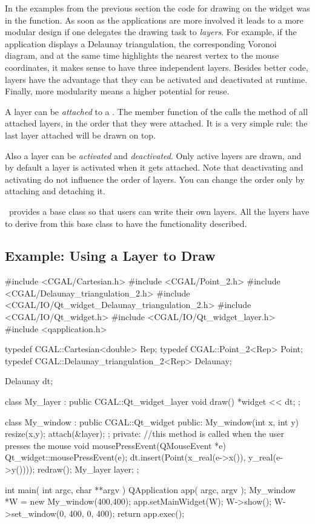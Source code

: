 In the examples from the previous section the code for drawing on the
widget was in the  function. As soon as the
applications are more involved it leads to a more modular design if
one delegates the drawing task to {\em layers}. For example, if the
application displays a Delaunay triangulation, the corresponding
Voronoi diagram, and at the same time highlights the nearest vertex to
the mouse coordinates, it makes sense to have three independent
layers. Besides better code, layers have the advantage that they can
be activated and deactivated at runtime. Finally, more modularity
means a higher potential for reuse.

A layer can be {\em attached} to a . The 
member function of the  calls
the method  of all attached layers, in the
order that they were attached. It is a very simple rule: the last layer
attached will be drawn on top.

Also a layer can be {\em activated} and {\em deactivated}. Only active
layers are drawn, and by default a layer is activated when it gets
attached.  Note that deactivating and activating do not influence the
order of layers. You can change the order only by attaching and
detaching it.


\cgal\ provides a base class so that users can write their own
layers. All the layers have to derive from this base class
 to have the functionality described.


\subsection{Example: Using a Layer to Draw}

\ccExample
\begin{ccExampleCode}
#include <CGAL/Cartesian.h>
#include <CGAL/Point_2.h>
#include <CGAL/Delaunay_triangulation_2.h>
#include <CGAL/IO/Qt_widget_Delaunay_triangulation_2.h>
#include <CGAL/IO/Qt_widget.h>
#include <CGAL/IO/Qt_widget_layer.h>
#include <qapplication.h>

typedef CGAL::Cartesian<double>             Rep;
typedef CGAL::Point_2<Rep>                  Point;
typedef CGAL::Delaunay_triangulation_2<Rep> Delaunay;

Delaunay dt;

class My_layer : public CGAL::Qt_widget_layer{
  void draw(){
    *widget << dt;
  }
};

class My_window : public CGAL::Qt_widget {
public:
  My_window(int x, int y)
  {
    resize(x,y);
    attach(&layer);
  };
private:
  //this method is called when the user presses the mouse
  void mousePressEvent(QMouseEvent *e)
  {
    Qt_widget::mousePressEvent(e);
    dt.insert(Point(x_real(e->x()), y_real(e->y())));
    redraw();
  }
  My_layer layer;
};

int main( int argc, char **argv )
{
    QApplication app( argc, argv );
    My_window *W = new My_window(400,400);
    app.setMainWidget(W);
    W->show();
    W->set_window(0, 400, 0, 400);
    return app.exec();
}
\end{ccExampleCode}


